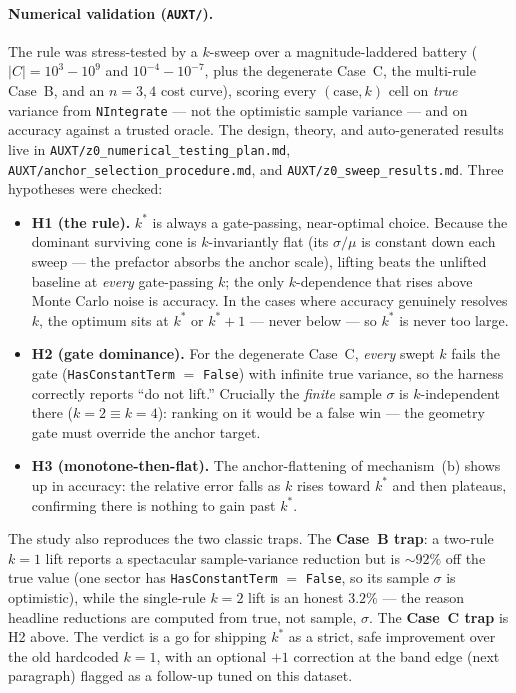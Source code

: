 \documentclass[11pt,a4paper]{article}
\begin{document}
\paragraph{Numerical validation (\texttt{AUXT/}).} The rule was stress-tested by
a $k$-sweep over a magnitude-laddered battery ($|C| = 10^3\!-\!10^9$ and
$10^{-4}\!-\!10^{-7}$, plus the degenerate Case~C, the multi-rule Case~B, and an
$n=3,4$ cost curve), scoring every $(\text{case},k)$ cell on \emph{true} variance
from \texttt{NIntegrate} --- not the optimistic sample variance --- and on
accuracy against a trusted oracle. The design, theory, and auto-generated results
live in \texttt{AUXT/z0\_numerical\_testing\_plan.md},
\texttt{AUXT/anchor\_selection\_procedure.md}, and
\texttt{AUXT/z0\_sweep\_results.md}. Three hypotheses were checked:
\begin{itemize}
  \item \textbf{H1 (the rule).} $k^{*}$ is always a gate-passing, near-optimal
    choice. Because the dominant surviving cone is $k$-invariantly flat (its
    $\sigma/\mu$ is constant down each sweep --- the prefactor absorbs the anchor
    scale), lifting beats the unlifted baseline at \emph{every} gate-passing $k$;
    the only $k$-dependence that rises above Monte Carlo noise is accuracy. In the
    cases where accuracy genuinely resolves $k$, the optimum sits at $k^{*}$ or
    $k^{*}{+}1$ --- never below --- so $k^{*}$ is never too large.
  \item \textbf{H2 (gate dominance).} For the degenerate Case~C, \emph{every}
    swept $k$ fails the gate (\texttt{HasConstantTerm} $=$ \texttt{False}) with
    infinite true variance, so the harness correctly reports ``do not lift.''
    Crucially the \emph{finite} sample $\sigma$ is $k$-independent there
    ($k{=}2 \equiv k{=}4$): ranking on it would be a false win --- the geometry
    gate must override the anchor target.
  \item \textbf{H3 (monotone-then-flat).} The anchor-flattening of mechanism~(b)
    shows up in accuracy: the relative error falls as $k$ rises toward $k^{*}$ and
    then plateaus, confirming there is nothing to gain past $k^{*}$.
\end{itemize}
The study also reproduces the two classic traps. The \textbf{Case~B trap}: a
two-rule $k{=}1$ lift reports a spectacular sample-variance reduction but is
$\sim\!92\%$ off the true value (one sector has \texttt{HasConstantTerm} $=$
\texttt{False}, so its sample $\sigma$ is optimistic), while the single-rule
$k{=}2$ lift is an honest $3.2\%$ --- the reason headline reductions are computed
from true, not sample, $\sigma$. The \textbf{Case~C trap} is H2 above. The
verdict is a go for shipping $k^{*}$ as a strict, safe improvement over the old
hardcoded $k=1$, with an optional $+1$ correction at the band edge (next
paragraph) flagged as a follow-up tuned on this dataset.
\end{document}
